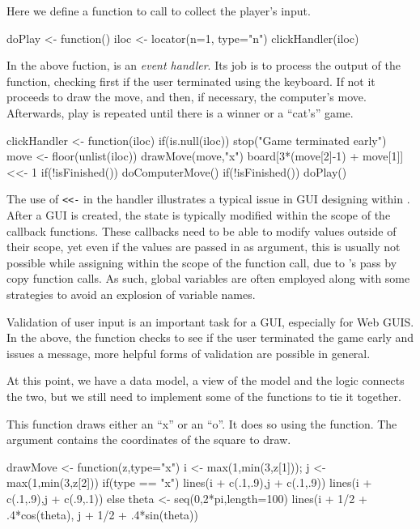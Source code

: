 Here we define a function to call to collect the player's input.
\begin{Schunk}
\begin{Sinput}
 doPlay <- function() {
   iloc <- locator(n=1, type="n")
   clickHandler(iloc)
 }
\end{Sinput}
\end{Schunk}

In the above fuction,
 is an \textit{event handler}. Its job is to process the output of the
 function, checking first if the user terminated
 using the keyboard. If not it proceeds to draw the
move, and then, if necessary, the computer's move. Afterwards, play is
repeated until there is a winner or a ``cat's'' game. 


\begin{Schunk}
\begin{Sinput}
 clickHandler <- function(iloc) {
   if(is.null(iloc)) 
     stop("Game terminated early")
   move <- floor(unlist(iloc))
   drawMove(move,"x")
   board[3*(move[2]-1) + move[1]] <<- 1
   if(!isFinished()) 
     doComputerMove()
   if(!isFinished()) 
     doPlay()
 }
\end{Sinput}
\end{Schunk}

The use of \verb+<<-+ in the handler illustrates a typical issue in
GUI designing within \R. After a GUI is created, the state is
typically modified within the scope of the callback functions. These
callbacks need to be able to modify values outside of their scope, yet
even if the values are passed in as argument, this is usually not
possible while assigning within the scope of the function call, due to
\R's pass by copy function calls. As such, global variables are often
employed along with some strategies to avoid an explosion of variable
names.

Validation of user input is an important task for a GUI, especially
for Web GUIS. In the above,
the  function checks to see if the user
terminated the game early and issues a message, more helpful forms of
validation are possible in general.

At this point, we have a data model, a view of the model and the
logic connects the two, but we still need to implement some of the
functions to tie it together.


This function draws either an ``x'' or an ``o''. It does so using the
 function. The  argument contains the
coordinates of the square to draw.
\begin{Schunk}
\begin{Sinput}
 drawMove <- function(z,type="x") {
   i <- max(1,min(3,z[1])); j <- max(1,min(3,z[2]))
   if(type == "x") {
     lines(i + c(.1,.9),j + c(.1,.9))
     lines(i + c(.1,.9),j + c(.9,.1))
   } else {
     theta <- seq(0,2*pi,length=100)
     lines(i + 1/2 + .4*cos(theta), j + 1/2 + .4*sin(theta))
   }
 }
\end{Sinput}
\end{Schunk}

